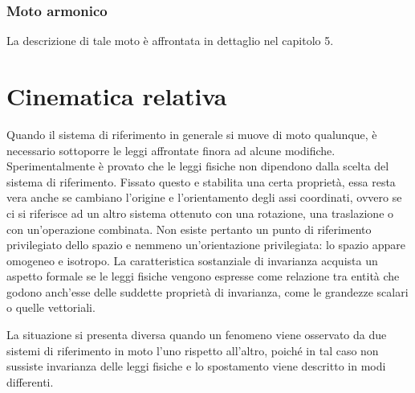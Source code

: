 \documentclass[10pt,a4paper]{book}
\begin{document}
\subsubsection{Moto armonico}

La descrizione di tale moto è affrontata in dettaglio nel capitolo 5.







































\section{Cinematica relativa}

Quando il sistema di riferimento in generale si muove di moto qualunque, è necessario sottoporre le leggi affrontate finora ad alcune modifiche. Sperimentalmente è provato che le leggi fisiche non dipendono dalla scelta del sistema di riferimento. Fissato questo e stabilita una certa proprietà, essa resta vera anche se cambiano l'origine e l'orientamento degli assi coordinati, ovvero se ci si riferisce ad un altro sistema ottenuto con una rotazione, una traslazione o con un'operazione combinata. Non esiste pertanto un punto di riferimento privilegiato dello spazio e nemmeno un'orientazione privilegiata: lo spazio appare omogeneo e isotropo. La caratteristica sostanziale di invarianza acquista un aspetto formale se le leggi fisiche vengono espresse come relazione tra entità che godono anch'esse delle suddette proprietà di invarianza, come le grandezze scalari o quelle vettoriali.

La situazione si presenta diversa quando un fenomeno viene osservato da due sistemi di riferimento in moto l'uno rispetto all'altro, poiché in tal caso non sussiste invarianza delle leggi fisiche e lo spostamento viene descritto in modi differenti.
\end{document}
